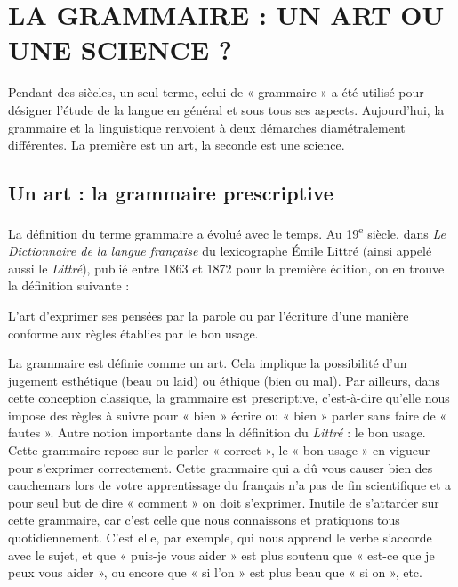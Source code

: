 \section{LA GRAMMAIRE : UN ART OU UNE SCIENCE ?}
Pendant des siècles, un seul terme, celui de « grammaire » a été utilisé pour désigner l’étude de la langue en général et sous tous ses aspects. Aujourd’hui, la grammaire et la linguistique renvoient à deux démarches diamétralement différentes. La première est un art, la seconde est une science.
\subsection{Un art : la grammaire prescriptive}
La définition du terme grammaire a évolué avec le temps. Au 19\textsuperscript{e} siècle, dans \textit{Le Dictionnaire de la langue française} du lexicographe Émile Littré (ainsi appelé aussi le \textit{Littré}), publié entre 1863 et 1872 pour la première édition, on en trouve la définition suivante :
\begin{lecture}{}
L’art d’exprimer ses pensées par la parole ou par l’écriture d’une manière conforme aux règles établies par le bon usage.
\end{lecture}
La grammaire est définie comme un art. Cela implique la possibilité d’un jugement esthétique (beau ou laid) ou éthique (bien ou mal). Par ailleurs, dans cette conception classique, la grammaire est prescriptive, c’est-à-dire qu’elle nous impose des règles à suivre pour « bien » écrire ou « bien » parler sans faire de « fautes ». Autre notion importante dans la définition du \textit{Littré} : le bon usage. Cette grammaire repose sur le parler « correct », le « bon usage » en vigueur pour s’exprimer correctement. Cette grammaire qui a dû vous causer bien des cauchemars lors de votre apprentissage du français n’a pas de fin scientifique et a pour seul but de dire « comment » on doit s’exprimer. Inutile de s’attarder sur cette grammaire, car c’est celle que nous connaissons et pratiquons tous quotidiennement. C’est elle, par exemple, qui nous apprend le verbe s’accorde avec le sujet, et que « puis-je vous aider » est plus soutenu que « est-ce que je peux vous aider », ou encore que « si l’on » est plus beau que « si on », etc.
